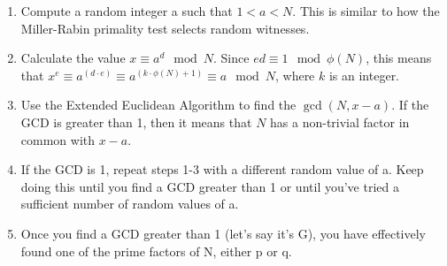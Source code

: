 \documentclass[12pt]{article}
\begin{document}
\begin{enumerate}
    \item Compute a random integer a such that $1<a<N$. This is similar to how the Miller-Rabin primality test selects random witnesses.
    \item Calculate the value $x\equiv a^d\mod{N}$. Since $ed\equiv1\mod{\phi{(N)}}$, this means that $x^e\equiv a^{(d\cdot e)}\equiv a^{(k\cdot\phi(N)+1)}\equiv a\mod{N}$, where $k$ is an integer.

    \item Use the Extended Euclidean Algorithm to find the $\gcd(N,x-a)$. If the GCD is greater than 1, then it means that $N$ has a non-trivial factor in common with $x-a$.

    \item If the GCD is 1, repeat steps 1-3 with a different random value of a. Keep doing this until you find a GCD greater than 1 or until you've tried a sufficient number of random values of a.

    \item Once you find a GCD greater than 1 (let's say it's G), you have effectively found one of the prime factors of N, either p or q.
\end{enumerate}
\end{document}
